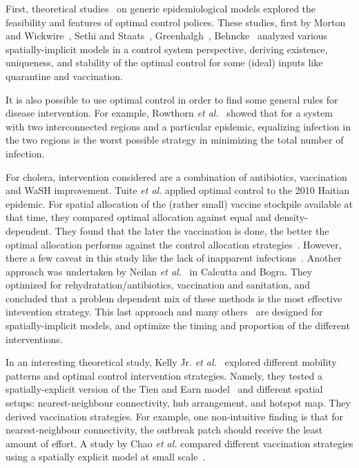 First, theoretical studies~\cite{kar_stability_2011, laguzet_global_2015} on  generic epidemiological models explored the feasibility and features of optimal control polices. These studies, first by Morton and Wickwire~\cite{morton_optimal_1974}, Sethi and Staats~\cite{sethi_optimal_1978}, Greenhalgh~\cite{greenhalgh_results_1988}, Behncke~\cite{behncke_optimal_2001} analyzed  various spatially-implicit models in a control system perspective, deriving existence, uniqueness, and stability of the optimal control for some (ideal) inputs like quarantine and vaccination.

It is also possible to use optimal control in order to find some general rules for disease intervention. For example, Rowthorn \textit{et al.}~\cite{rowthorn_optimal_2009} showed that for a system with two interconnected regions and a particular epidemic, equalizing infection in the two regions is the worst possible strategy in minimizing the total number of infection.

For cholera, intervention considered are a combination of antibiotics, vaccination and WaSH improvement. Tuite \textit{et al.} applied optimal control to the 2010 Haitian epidemic. For spatial allocation of the (rather small) vaccine stockpile available at that time, they compared optimal allocation against equal and density-dependent. They found that the later the vaccination is done, the better the optimal allocation performs against the control allocation strategies~\cite{tuite_cholera_2011}. However, there a few caveat in this study like the lack of inapparent infections~\cite{king_inapparent_2008, rinaldo_reassessment_2012}. Another approach was undertaken by Neilan \textit{et al.}~\cite{millerneilan_modeling_2010} in Calcutta and Bogra. They optimized for rehydratation/antibiotics, vaccination and sanitation, and concluded that a problem dependent mix of these methods is the most effective intevention strategy. This last approach and many others~\cite{sardar_optimal_2013} are designed for spatially-implicit models, and optimize the timing and proportion of the different interventions.

In an interesting theoretical study, Kelly Jr. \textit{et al.}~\cite{kelly_impact_2016} explored different mobility patterns and  optimal control intervention strategies. Namely, they tested a spatially-explicit version of the Tien and Earn model~\cite{tien_multiple_2010} and different spatial setups: nearest-neighbour connectivity, hub arrangement, and  hotspot map. They derived vaccination strategies. For example, one non-intuitive finding is that for nearest-neighbour connectivity, the outbreak patch should receive the least amount of effort.  A study by Chao \textit{et al.} compared different vaccination strategies using a spatially explicit model at small scale~\cite{chao_vaccination_2011}.  

